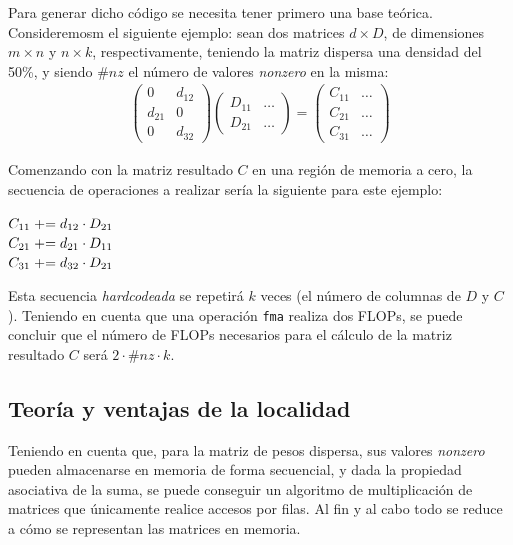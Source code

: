 Para generar dicho código se necesita tener primero una base teórica. Consideremosm el siguiente ejemplo: sean dos matrices $d \times D$, de dimensiones $m \times n$ y $n \times k$, respectivamente, teniendo la matriz dispersa una densidad del 50\%, y siendo $\#nz$ el número de valores \textit{nonzero} en la misma:
\begin{gather}
    \begin{pmatrix}
        0 & d_{12}\\
        d_{21} & 0\\
        0 & d_{32}
    \end{pmatrix}	
    \begin{pmatrix}
        D_{11} & \dots\\
        D_{21} & \dots
    \end{pmatrix}
    =
    \begin{pmatrix}
        C_{11} & \dots\\
        C_{21} & \dots\\
        C_{31} & \dots
    \end{pmatrix} \nonumber %
\end{gather}

Comenzando con la matriz resultado $C$ en una región de memoria a cero, la secuencia de operaciones a realizar sería la siguiente para este ejemplo:
\begin{center}
    $C_{11} \mathrel{+}= d_{12} \cdot D_{21}$\\
    $C_{21} \mathrel{+}= d_{21} \cdot D_{11}$\\
    $C_{31} \mathrel{+}= d_{32} \cdot D_{21}$\\
\end{center}

Esta secuencia \textit{hardcodeada} se repetirá $k$ veces (el número de columnas de $D$ y $C$). Teniendo en cuenta que una operación \texttt{\acrshort{fma}} realiza dos FLOPs, se puede concluir que el número de FLOPs necesarios para el cálculo de la matriz resultado $C$ será $2 \cdot \#nz \cdot k$.

\subsection{Teoría y ventajas de la localidad}
\label{ssec:teoria_ventajas_localidad}
Teniendo en cuenta que, para la matriz de pesos dispersa, sus valores \textit{nonzero} pueden almacenarse en memoria de forma secuencial, y dada la propiedad asociativa de la suma, se puede conseguir un algoritmo de multiplicación de matrices que únicamente realice accesos por filas. Al fin y al cabo todo se reduce a cómo se representan las matrices en memoria.

